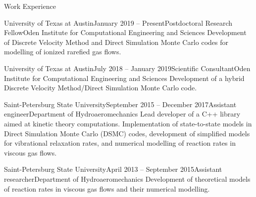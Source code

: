 \documentclass{resume} %
\begin{document}

\begin{rSection}{Work Experience}

\begin{rSubsection}{University of Texas at Austin}{January 2019 -- Present}{Postdoctoral Research Fellow}{Oden Institute for Computational Engineering and Sciences}
Development of Discrete Velocity Method and Direct Simulation Monte Carlo codes for modelling of ionized rarefied gas flows.
\end{rSubsection}


\begin{rSubsection}{University of Texas at Austin}{July 2018 -- January 2019}{Scientific Consultant}{Oden Institute for Computational Engineering and Sciences}
Development of a hybrid Discrete Velocity Method/Direct Simulation Monte Carlo code.
\end{rSubsection}

\begin{rSubsection}{Saint-Petersburg State University}{September 2015 -- December 2017}{Assistant engineer}{Department of Hydroaeromechanics}
Lead developer of a C++ library aimed at kinetic theory computations. Implementation of state-to-state models in Direct Simulation Monte Carlo (DSMC) codes, development of simplified models for vibrational relaxation rates, and numerical modelling of reaction rates in viscous gas flows.
\end{rSubsection}

\begin{rSubsection}{Saint-Petersburg State University}{April 2013 -- September 2015}{Assistant researcher}{Department of Hydroaeromechanics}
Development of theoretical models of reaction rates in viscous gas flows and their numerical modelling.
\end{rSubsection}



\end{rSection}
\end{document}
